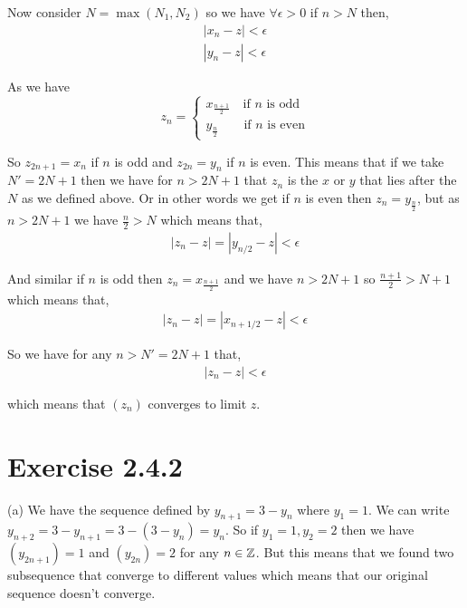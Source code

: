 \documentclass[a4paper]{report}
\begin{document}
Now consider $N = \max(N_{1}, N_{2})$ so we have $\forall \epsilon > 0$ if $n > N$ then,
\begin{align*}
	\left | x_n - z \right | < \epsilon \\
	\left | y_n - z \right | < \epsilon
\end{align*}

As we have $$z_n = \begin{cases} x_{\frac{n + 1}{2}} \quad \text{if $n$ is odd} \\ y_{\frac{n}{2}} \qquad \text{if $n$ is even}\end{cases}$$

So $z_{2n + 1} = x_n$ if $n$ is odd and $z_{2n} = y_n$ if $n$ is even. This means that if we take $N' = 2N + 1$ then we have for $n > 2N + 1$ that $z_n$  is the $x$ or $y$ that lies after the $N$ as we defined above. Or in other words we get if $n$ is even then $z_n = y_{\frac{n}{2}}$, but as $n > 2N + 1$ we have $\frac{n}{2} > N$ which means that,
\begin{align*}
	 \left | z_n - z \right | = \left | y_{n / 2} - z  \right | < \epsilon
\end{align*}

And similar if $n$ is odd then $z_n = x_{\frac{n + 1}{2}} $ and we have $n > 2N + 1$ so $\frac{n + 1}{2} > N + 1$ which means that,
\begin{align*}
	 \left | z_n - z \right | = \left | x_{n + 1 / 2} - z  \right | < \epsilon
\end{align*}

So we have for any $n > N' = 2N + 1$ that,
\begin{align*}
	\left | z_n - z \right | < \epsilon
\end{align*}

which means that $(z_n)$ converges to limit $z$.




	



\section*{Exercise 2.4.2}

(a) We have the sequence defined by $y_{n + 1} = 3 - y_n$ where $y_1 = 1$. We can write $y_{n + 2} = 3 - y_{n + 1} = 3 - (3 - y_n) = y_n$. So if  $y_{1} = 1, y_{2} = 2$ then we have $(y_{2n + 1}) = 1$ and $(y_{2n}) = 2$ for any $n \in \mathbb{Z}$. But this means that we found two subsequence that converge to different values which means that our original sequence doesn't converge.
\end{document}
